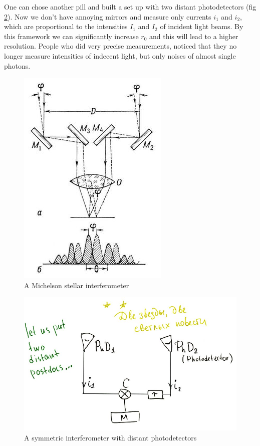 One can chose another pill and built a set up with two distant photodetectors (fig \ref{fig:new_stellar}). Now we don't have annoying mirrors and measure only currents $i_1$ and $i_2$, which are proportional to the intensities $I_1$ and $I_2$ of incident light beams. By this framework we can significantly increase $r_0$ and this will lead to a higher resolution. People who did very precise measurements, noticed that they no longer measure intensities of indecent light, but only noises of almost single photons.


\begin{figure}
	\centering
	\includegraphics[width=0.6\linewidth]{fig/L3/stellar}
	\caption{A Michelson stellar interferometer}
	\label{fig:stellar}
\end{figure}


\begin{figure}
	\centering
	\includegraphics[width=0.8\linewidth]{fig/L3/new_stellar}
	\caption{A symmetric interferometer with distant photodetectors}
	\label{fig:new_stellar}
\end{figure}




